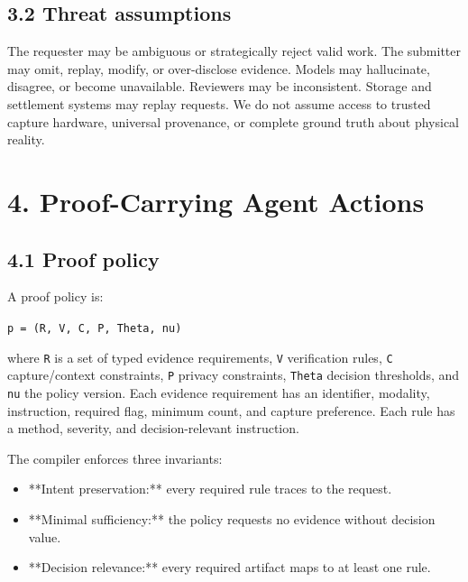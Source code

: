 \documentclass[11pt]{article}
\begin{document}
\subsection{3.2 Threat assumptions}

The requester may be ambiguous or strategically reject valid work. The submitter may omit, replay, modify, or over-disclose evidence. Models may hallucinate, disagree, or become unavailable. Reviewers may be inconsistent. Storage and settlement systems may replay requests. We do not assume access to trusted capture hardware, universal provenance, or complete ground truth about physical reality.\par

\section{4. Proof-Carrying Agent Actions}

\subsection{4.1 Proof policy}

A proof policy is:\par

\texttt{p = (R, V, C, P, Theta, nu)}\par

where \texttt{R} is a set of typed evidence requirements, \texttt{V} verification rules, \texttt{C} capture/context constraints, \texttt{P} privacy constraints, \texttt{Theta} decision thresholds, and \texttt{nu} the policy version. Each evidence requirement has an identifier, modality, instruction, required flag, minimum count, and capture preference. Each rule has a method, severity, and decision-relevant instruction.\par

The compiler enforces three invariants:\par

\begin{itemize}\item **Intent preservation:** every required rule traces to the request.\end{itemize}
\begin{itemize}\item **Minimal sufficiency:** the policy requests no evidence without decision value.\end{itemize}
\begin{itemize}\item **Decision relevance:** every required artifact maps to at least one rule.\end{itemize}
\end{document}
